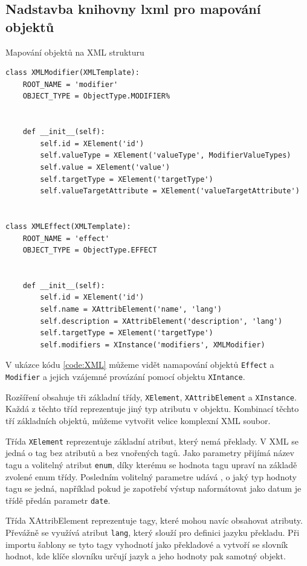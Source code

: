 \documentclass[thesis=B,czech]{resources/FITthesis}[2012/06/26]
\begin{document}
	\subsection{Nadstavba knihovny lxml pro mapování objektů}
	\begin{listing}[htbp]
\caption{\label{code:XML}Mapování objektů na XML strukturu}
\begin{verbatim}
class XMLModifier(XMLTemplate):
    ROOT_NAME = 'modifier'
    OBJECT_TYPE = ObjectType.MODIFIER%


    def __init__(self):
        self.id = XElement('id')
        self.valueType = XElement('valueType', ModifierValueTypes)
        self.value = XElement('value')
        self.targetType = XElement('targetType')
        self.valueTargetAttribute = XElement('valueTargetAttribute')


class XMLEffect(XMLTemplate):
    ROOT_NAME = 'effect'
    OBJECT_TYPE = ObjectType.EFFECT


    def __init__(self):
        self.id = XElement('id')
        self.name = XAttribElement('name', 'lang')
        self.description = XAttribElement('description', 'lang')
        self.targetType = XElement('targetType')
        self.modifiers = XInstance('modifiers', XMLModifier)
\end{verbatim}
\end{listing}
	 V ukázce kódu  \ref{code:XML} můžeme vidět namapování objektů \texttt{Effect} a \texttt{Modifier} a jejich vzájemné provázání pomocí objektu \texttt{XIntance}. \par

Rozšíření obsahuje tři základní třídy, \texttt{XElement}, \texttt{XAttribElement} a \texttt{XInstance}. Každá z těchto tříd reprezentuje jiný typ atributu v objektu. Kombinací těchto tří základních objektů, můžeme vytvořit velice komplexní XML soubor. \par

Třída \texttt{XElement} reprezentuje základní atribut, který nemá překlady. V XML se jedná o tag bez atributů a bez vnořených tagů. Jako parametry přijímá název tagu a volitelný atribut \texttt{enum}, díky kterému se hodnota tagu upraví na základě zvolené enum třídy. Posledním volitelný parametre udává , o jaký typ hodnoty tagu se jedná, například pokud je zapotřebí výstup naformátovat jako datum je třídě předán parametr \texttt{date}. \par

Třída XAttribElement reprezentuje tagy, které mohou navíc obsahovat atributy. Převážně se využívá atribut \texttt{lang}, který slouží pro definici jazyku překladu. Při importu šablony se tyto tagy vyhodnotí jako překladové a vytvoří se slovník hodnot, kde klíče slovníku určují jazyk a jeho hodnoty pak samotný objekt. \par
\end{document}
